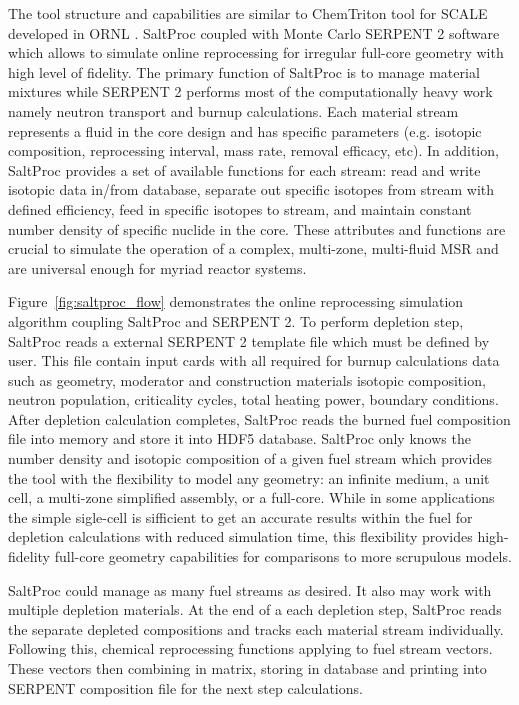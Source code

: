 The tool structure and capabilities are similar to ChemTriton tool for SCALE developed in \gls{ORNL} \cite{powers_new_2013}. SaltProc coupled with Monte Carlo SERPENT 2 software which allows to simulate online reprocessing for irregular full-core geometry with high level of fidelity.  The primary function of SaltProc is to manage material mixtures while SERPENT 2 performs most of the computationally heavy work namely neutron transport and burnup calculations. Each material stream represents a fluid in the core design and has specific parameters (e.g. isotopic composition, reprocessing interval, mass rate, removal efficacy, etc). In addition, SaltProc provides a set of available functions for each stream: read and write isotopic data in/from database, separate out specific isotopes from stream with defined efficiency, feed in specific isotopes to stream, and maintain constant number density of specific nuclide in the core. These attributes and functions are crucial to simulate the operation of a complex, multi-zone, multi-fluid \gls{MSR} and are universal enough for myriad reactor systems.

Figure~\ref{fig:saltproc_flow} demonstrates the  online reprocessing simulation algorithm coupling SaltProc and SERPENT 2. To perform depletion step, SaltProc reads a external SERPENT 2 template file which must be defined by user. This file contain input cards with all required for burnup calculations data such as geometry, moderator and construction materials isotopic composition, neutron population, criticality cycles, total heating power, boundary conditions. After depletion calculation completes, SaltProc reads the burned fuel composition file into memory and store it into HDF5 database. SaltProc only knows the number density and isotopic composition of a given fuel stream which provides the tool with the flexibility to model any geometry: an infinite medium, a unit cell, a multi-zone simplified assembly, or a full-core. While in some applications the simple sigle-cell is sifficient to get an accurate results within the fuel for depletion calculations with reduced simulation time, this flexibility provides high-fidelity full-core geometry capabilities for comparisons to more scrupulous models.

SaltProc could manage as many fuel streams as desired. It also may work with multiple depletion materials. At the end of a each depletion step, SaltProc reads the separate depleted compositions and tracks each material stream individually. Following this, chemical reprocessing functions applying to fuel stream vectors. These vectors then combining in matrix, storing in database and printing into SERPENT composition file for the next step calculations.


